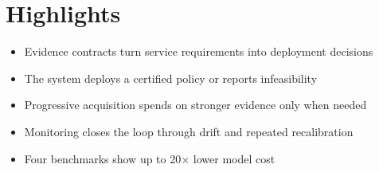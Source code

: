 \documentclass[11pt]{article}
\begin{document}
\section*{Highlights}
\begin{itemize}
\item Evidence contracts turn service requirements into deployment decisions
\item The system deploys a certified policy or reports infeasibility
\item Progressive acquisition spends on stronger evidence only when needed
\item Monitoring closes the loop through drift and repeated recalibration
\item Four benchmarks show up to 20$\times$ lower model cost
\end{itemize}
\end{document}
